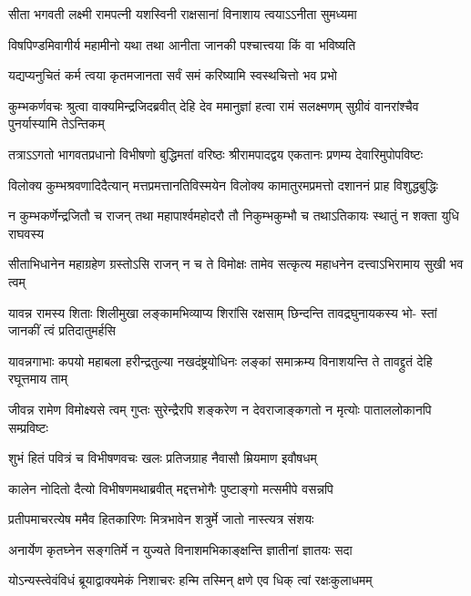 \twolineshloka
{सीता भगवती लक्ष्मी रामपत्नी यशस्विनी}
{राक्षसानां विनाशाय त्वयाऽऽनीता सुमध्यमा} %

\twolineshloka
{विषपिण्डमिवागीर्य महामीनो यथा तथा}
{आनीता जानकी पश्चात्त्वया किं वा भविष्यति} %

\twolineshloka
{यद्यप्यनुचितं कर्म त्वया कृतमजानता}
{सर्वं समं करिष्यामि स्वस्थचित्तो भव प्रभो} %

\threelineshloka
{कुम्भकर्णवचः श्रुत्वा वाक्यमिन्द्रजिदब्रवीत्}
{देहि देव ममानुज्ञां हत्वा रामं सलक्ष्मणम्}
{सुग्रीवं वानरांश्चैव पुनर्यास्यामि तेऽन्तिकम्} %

\fourlineindentedshloka
{तत्राऽऽगतो भागवतप्रधानो}
{विभीषणो बुद्धिमतां वरिष्ठः}
{श्रीरामपादद्वय एकतानः}
{प्रणम्य देवारिमुपोपविष्टः} %

\fourlineindentedshloka
{विलोक्य कुम्भश्रवणादिदैत्यान्}
{मत्तप्रमत्तानतिविस्मयेन}
{विलोक्य कामातुरमप्रमत्तो}
{दशाननं प्राह विशुद्धबुद्धिः} %

\fourlineindentedshloka
{न कुम्भकर्णेन्द्रजितौ च राजन्}
{तथा महापार्श्वमहोदरौ तौ}
{निकुम्भकुम्भौ च तथाऽतिकायः}
{स्थातुं न शक्ता युधि राघवस्य} %

\fourlineindentedshloka
{सीताभिधानेन महाग्रहेण}
{ग्रस्तोऽसि राजन् न च ते विमोक्षः}
{तामेव सत्कृत्य महाधनेन}
{दत्त्वाऽभिरामाय सुखी भव त्वम्} %

\fourlineindentedshloka
{यावन्न रामस्य शिताः शिलीमुखा}
{लङ्कामभिव्याप्य शिरांसि रक्षसाम्}
{छिन्दन्ति तावद्रघुनायकस्य भो-}
{स्तां जानकीं त्वं प्रतिदातुमर्हसि} %

\fourlineindentedshloka
{यावन्नगाभाः कपयो महाबला}
{हरीन्द्रतुल्या नखदंष्ट्रयोधिनः}
{लङ्कां समाक्रम्य विनाशयन्ति ते}
{तावद्द्रुतं देहि रघूत्तमाय ताम्} %

\fourlineindentedshloka
{जीवन्न रामेण विमोक्ष्यसे त्वम्}
{गुप्तः सुरेन्द्रैरपि शङ्करेण}
{न देवराजाङ्कगतो न मृत्योः}
{पाताललोकानपि सम्प्रविष्टः} %

\twolineshloka
{शुभं हितं पवित्रं च विभीषणवचः खलः}
{प्रतिजग्राह नैवासौ म्रियमाण इवौषधम्} %

\twolineshloka
{कालेन नोदितो दैत्यो विभीषणमथाब्रवीत्}
{मद्दत्तभोगैः पुष्टाङ्गो मत्समीपे वसन्नपि} %

\twolineshloka
{प्रतीपमाचरत्येष ममैव हितकारिणः}
{मित्रभावेन शत्रुर्मे जातो नास्त्यत्र संशयः} %

\twolineshloka
{अनार्येण कृतघ्नेन सङ्गतिर्मे न युज्यते}
{विनाशमभिकाङ्क्षन्ति ज्ञातीनां ज्ञातयः सदा} %

\twolineshloka
{योऽन्यस्त्वेवंविधं ब्रूयाद्वाक्यमेकं निशाचरः}
{हन्मि तस्मिन् क्षणे एव धिक् त्वां रक्षःकुलाधमम्} %

